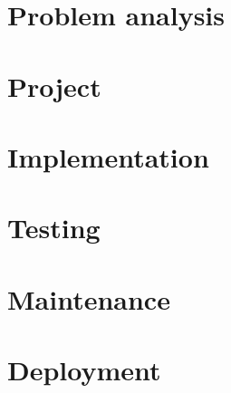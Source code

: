 \documentclass{../llncs}
\newcommand{\labelsec}[1]{\label{sec:#1}}
\begin{document}
\section{Problem analysis}
\labelsec{ProblemAnalysis}


\section{Project}
\labelsec{Project}

\section{Implementation}
\labelsec{Implementation}

\section{Testing}
\labelsec{Testing}

\section{Maintenance}
\labelsec{Maintenance}

\section{Deployment}
\labelsec{Deployment}
 
\end{document}
